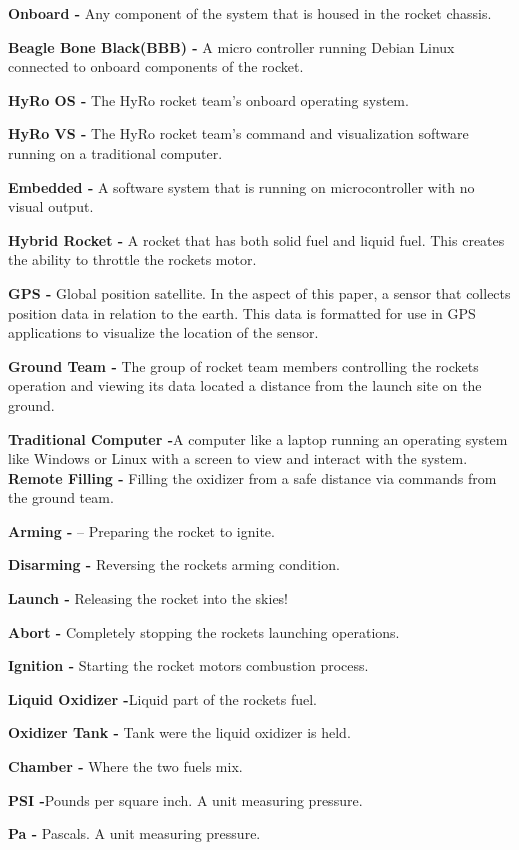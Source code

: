 \documentclass[10pt,draftclsnofoot,onecolumn]{IEEEtran}
\begin{document}
{\bf Onboard -} Any component of the system that is housed in the rocket chassis. \par
{\bf Beagle Bone Black(BBB) -}   A micro controller running Debian Linux connected to onboard components of the rocket.\par
{\bf HyRo OS -}  The HyRo rocket team’s onboard operating system.\par
{\bf HyRo VS -} The HyRo rocket team’s command and visualization software running on a traditional computer. \par
{\bf Embedded -} A software system that is running on microcontroller with no visual output. \par
{\bf Hybrid Rocket -} A rocket that has both solid fuel and liquid fuel. This creates the ability to throttle the rockets motor. \par
{\bf GPS -} Global position satellite. In the aspect of this paper, a sensor that collects position data in relation to the earth. This data is formatted for use in GPS applications to visualize the location of the sensor.\par
{\bf Ground Team -} The group of rocket team members controlling the rockets operation and viewing its data located a distance from the launch site on the ground.\par
{\bf Traditional Computer -}A computer like a laptop running an operating system like Windows or Linux with a screen to view and interact with the system.
{\bf Remote Filling -} Filling the oxidizer from a safe distance via commands from the ground team.\par
{\bf Arming -} – Preparing the rocket to ignite.\par
{\bf Disarming -} Reversing the rockets arming condition. \par
{\bf Launch -} Releasing the rocket into the skies! \par
{\bf Abort -} Completely stopping the rockets launching operations.\par
{\bf Ignition -} Starting the rocket motors combustion process. \par
{\bf Liquid Oxidizer -}Liquid part of the rockets fuel. \par
{\bf Oxidizer Tank -} Tank were the liquid oxidizer is held. \par
{\bf Chamber -} Where the two fuels mix.\par
{\bf PSI -}Pounds per square inch. A unit measuring pressure. \par
{\bf Pa -} Pascals. A unit measuring pressure.\par
\end{document}
